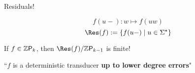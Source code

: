 \documentclass{beamer}
\begin{document}
\begin{frame}{Residuals!}
    \begin{definition}
        \begin{equation*}
             f(u -) \colon w \mapsto f(uw)
         \end{equation*}
         \begin{equation*}
         \Res(f) \defined \setof{f(u -)}{u \in \words}
         \end{equation*}
    \end{definition}
    \pause
    \begin{theorem}
        If $f \in \Zpoly[k]$, then
        $\Res(f) / \Zpoly[k-1]$ is finite!
    \end{theorem}
    \pause
    \begin{center}
        ``$f$ is a deterministic transducer \textbf{up to lower degree errors}"
    \end{center}
\end{frame}
\end{document}
